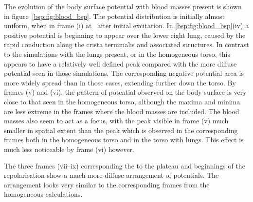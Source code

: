 The evolution of the body surface potential with blood masses present is shown in
figure~\ref{bsp:fig:blood_bsp}.
The potential distribution is initially almost uniform, when  in frame (i) at
\ after initial excitation.
In \ref{bsp:fig:blood_bsp}(iv) a positive potential is beginning to appear over
the lower right lung, caused by the rapid conduction along the crista
terminalis and associated structures.
In contrast to the simulations with the lungs present, or in the homogeneous
torso, this appears to have a relatively well defined peak compared with the
more diffuse potential seen in those simulations.
The corresponding negative potential area is more widely spread than in those
cases, extending further down the torso.
By frames (v) and (vi), the pattern of potential observed on the body surface is
very close to that seen in the homogeneous torso, although the maxima and minima
are less extreme in the frames where the blood masses are included.
The blood masses also seem to act as a focus, with the peak visible in frame (v)
much smaller in spatial extent than the peak which is observed in the
corresponding frames both in the homogeneous torso and in the torso with lungs.
This effect is much less noticeable by frame (vi) however.

The three frames (vii--ix) corresponding the to the plateau and beginnings of the
repolarisation show a much more diffuse arrangement of potentials.
The arrangement looks very similar to the corresponding frames from the
homogeneous calculations.


